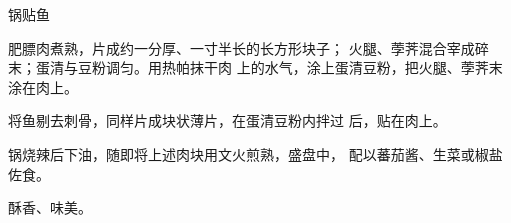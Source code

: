 \begin{recipe}{锅贴鱼}

\ingredients



\cooking

肥膘肉煮熟，片成约一分厚、一寸半长的长方形块子； 火腿、荸荠混合宰成碎末；蛋清与豆粉调匀。用热帕抹干肉 上的水气，涂上蛋清豆粉，把火腿、荸荠末涂在肉上。

将鱼剔去刺骨，同样片成块状薄片，在蛋清豆粉内拌过 后，贴在肉上。

锅烧辣后下油，随即将上述肉块用文火煎熟，盛盘中， 配以蕃茄酱、生菜或椒盐佐食。

\notes

酥香、味美。

\end{recipe}


